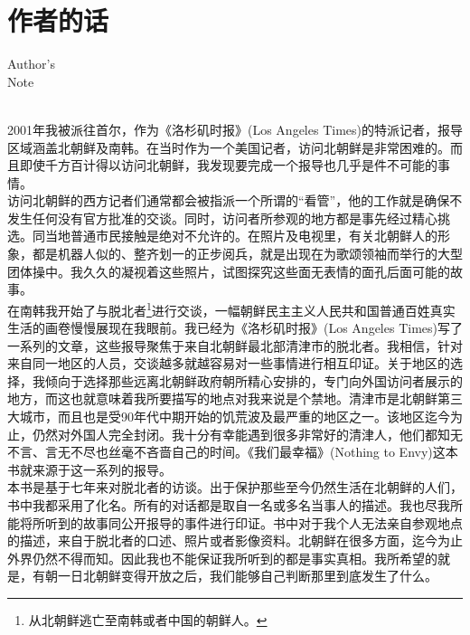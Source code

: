 \fancyhead[RO]{{\tiny{\textcolor{Gray}{\FA \ }}}\thepage}
\fancyhead[LE]{{\tiny{\textcolor{Gray}{\FA \ }}}\thepage}
\fancyfoot[LE,RO]{}
\fancyfoot[LO,CE]{}
\fancyfoot[CO,RE]{}
\chapter*{作者的话}
\vspace{5mm}
\begin{flushright}
	\textcolor{PinYinColor}{\EN \huge{Author's\\
	Note\\
	\ \\}}
\end{flushright}

\ifnum{}
	\begin{multicols}{\theparacolNo}
\fi
2001年我被派往首尔，作为《洛杉矶时报》(Los Angeles Times)的特派记者，报导区域涵盖北朝鲜及南韩。在当时作为一个美国记者，访问北朝鲜是非常困难的。而且即使千方百计得以访问北朝鲜，我发现要完成一个报导也几乎是件不可能的事情。\\

访问北朝鲜的西方记者们通常都会被指派一个所谓的“看管”，他的工作就是确保不发生任何没有官方批准的交谈。同时，访问者所参观的地方都是事先经过精心挑选。同当地普通市民接触是绝对不允许的。在照片及电视里，有关北朝鲜人的形象，都是机器人似的、整齐划一的正步阅兵，就是出现在为歌颂领袖而举行的大型团体操中。我久久的凝视着这些照片，试图探究这些面无表情的面孔后面可能的故事。\\

在南韩我开始了与脱北者\footnote{从北朝鲜逃亡至南韩或者中国的朝鲜人。}进行交谈，一幅朝鲜民主主义人民共和国普通百姓真实生活的画卷慢慢展现在我眼前。我已经为《洛杉矶时报》(Los Angeles Times)写了一系列的文章，这些报导聚焦于来自北朝鲜最北部清津市的脱北者。我相信，针对来自同一地区的人员，交谈越多就越容易对一些事情进行相互印证。关于地区的选择，我倾向于选择那些远离北朝鲜政府朝所精心安排的，专门向外国访问者展示的地方，而这也就意味着我所要描写的地点对我来说是个禁地。清津市是北朝鲜第三大城市，而且也是受90年代中期开始的饥荒波及最严重的地区之一。该地区迄今为止，仍然对外国人完全封闭。我十分有幸能遇到很多非常好的清津人，他们都知无不言、言无不尽也丝毫不吝啬自己的时间。《我们最幸福》(Nothing to Envy)这本书就来源于这一系列的报导。\\

本书是基于七年来对脱北者的访谈。出于保护那些至今仍然生活在北朝鲜的人们，书中我都采用了化名。所有的对话都是取自一名或多名当事人的描述。我也尽我所能将所听到的故事同公开报导的事件进行印证。书中对于我个人无法亲自参观地点的描述，来自于脱北者的口述、照片或者影像资料。北朝鲜在很多方面，迄今为止外界仍然不得而知。因此我也不能保证我所听到的都是事实真相。我所希望的就是，有朝一日北朝鲜变得开放之后，我们能够自己判断那里到底发生了什么。\\
\ifnum{}
	\end{multicols}
\fi
